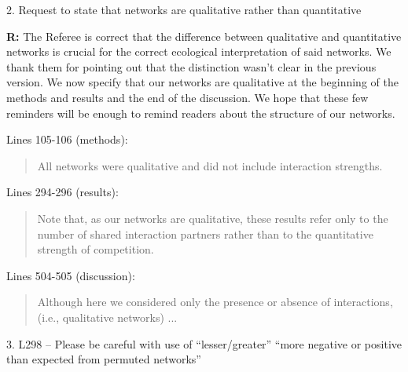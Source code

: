 \documentclass[12pt]{letter}
\begin{document}


	2. Request to state that networks are qualitative rather than quantitative 

		\textbf{R:} The Referee is correct that the difference between qualitative and quantitative networks is crucial for the correct ecological interpretation of said networks. We thank them for pointing out that the distinction wasn't clear in the previous version. We now specify that our networks are qualitative at the beginning of the methods and results and the end of the discussion. We hope that these few reminders will be enough to remind readers about the structure of our networks.

		Lines 105-106 (methods):

		\begin{quotation}

			All networks were qualitative and did not include interaction strengths.

		\end{quotation}


		Lines 294-296 (results):

		\begin{quotation}

			Note that, as our networks 
		    are qualitative, these results refer only to the number of shared interaction
	    	partners rather than to the quantitative strength of competition.

    	\end{quotation}


    	Lines 504-505 (discussion):

    	\begin{quotation}

		  Although here we considered only the presence or absence of interactions,
		  (i.e., qualitative networks) ...

    	\end{quotation}


	3. L298 – Please be careful with use of “lesser/greater” “more negative or positive than expected from permuted networks” 
\end{document}
